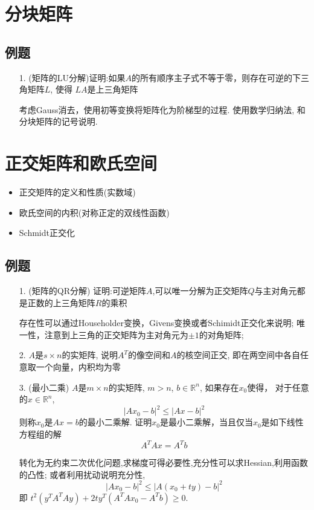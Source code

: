 \section{分块矩阵}
\subsection*{例题}
\begin{itemize}
	\item[1.] (矩阵的LU分解)证明:如果$A$的所有顺序主子式不等于零，则存在可逆的下三角矩阵$L$, 使得
	$LA$是上三角矩阵
	\begin{solution}
		考虑Gauss消去，使用初等变换将矩阵化为阶梯型的过程.
		使用数学归纳法, 和分块矩阵的记号说明.
	\end{solution}
	\vspace{2cm}
\end{itemize}

\section{正交矩阵和欧氏空间}
\begin{itemize}
\item 正交矩阵的定义和性质(实数域)
\item 欧氏空间的内积(对称正定的双线性函数)
\item Schmidt正交化
\end{itemize}

\subsection*{例题}
\begin{itemize}
	\item[1.] (矩阵的QR分解)
	证明:可逆矩阵$A$,可以唯一分解为正交矩阵$Q$与主对角元都是正数的上三角矩阵$R$的乘积
	\begin{solution}
		存在性可以通过Householder变换，Givens变换或者Schimidt正交化来说明;
		唯一性，注意到上三角的正交矩阵为主对角元为$\pm 1$的对角矩阵;
	\end{solution}
	\vspace{2cm}

	\item[2.] $A$是$s\times n$的实矩阵, 说明$A^T$的像空间和$A$的核空间正交, 
	即在两空间中各自任意取一个向量，内积均为零
	\vspace{2cm}

	\item[3.] (最小二乘) $A$是$m\times n$的实矩阵, $m > n$, $b \in \mathbb{R}^n$,
	如果存在$x_0$使得， 对于任意的$x \in \mathbb{R}^n$,
	$$|Ax_0-b|^2 \le |Ax-b|^2$$
	则称$x_0$是$Ax=b$的最小二乘解. 证明$x_0$是最小二乘解，当且仅当$x_0$是如下线性方程组的解
	$$A^TAx=A^Tb$$
	\begin{solution}
	转化为无约束二次优化问题,求梯度可得必要性,充分性可以求Hessian,利用函数的凸性;
	或者利用扰动说明充分性, 
	$$|Ax_0-b|^2 \le |A(x_0+ty)-b|^2$$
	即 $t^2(y^TA^TAy) + 2ty^T(A^TAx_0 - A^Tb) \ge 0.$
	\end{solution}
	\vspace{2cm}
\end{itemize}


